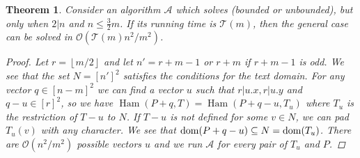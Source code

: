 \documentclass[11pt]{article}
\renewcommand{\O}{\mathcal{O}}
\newcommand{\floor}[1]{\left\lfloor #1 \right\rfloor}
\theoremstyle{plain}
\newtheorem{theorem}{Theorem}
\theoremstyle{definition}
\theoremstyle{remark}
\DeclareMathOperator*{\Ham}{Ham}
\begin{document}
\begin{theorem}\label{instancing}
	Consider an algorithm $\mathcal{A}$ which solves \HD (bounded or unbounded), but only when $2|n$ and $n \le \frac{3}{2}m$.
	If its running time is $\mathcal{T}(m)$, then the general case can be solved in $\O(\mathcal{T}(m) n^2 / m^2)$.
	\begin{proof}
		Let $r = \floor{m / 2}$ and let $n' = r + m - 1$ or $r + m$ if $r + m - 1$ is odd.
		We see that the set $N = [n']^2$ satisfies the conditions for the text domain.
		For any vector $q \in [n - m]^2$ we can find a vector $u$ such that $r|u.x, r|u.y$ and $q - u \in [r]^2$,
		so we have $\Ham(P + q, T) = \Ham(P + q - u, T_u)$ where $T_u$ is the restriction of $T - u$ to $N$.
		If $T - u$ is not defined for some $v \in N$, we can pad $T_u(v)$ with any character.
		We see that $\operatorname*{dom}(P + q - u) \subseteq N = \operatorname*{dom}(T_u)$.
		There are $\O(n^2 / m^2)$ possible vectors $u$ and we run $\mathcal{A}$ for every pair of $T_u$ and $P$.
	\end{proof}
\end{theorem}
\end{document}
